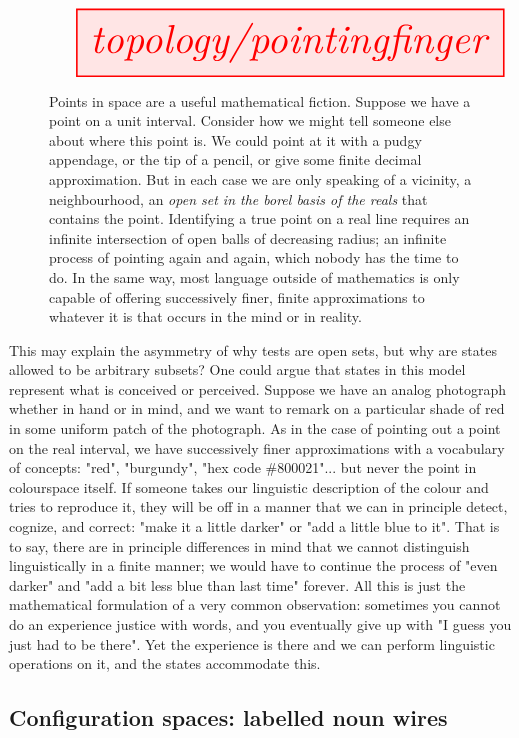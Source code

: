 \begin{figure}[h!]\label{fig:pointing}
\[\resizebox{\textwidth}{!}{\tikzfig{topology/pointingfinger}}\]
\caption{Points in space are a useful mathematical fiction. Suppose we have a point on a unit interval. Consider how we might tell someone else about where this point is. We could point at it with a pudgy appendage, or the tip of a pencil, or give some finite decimal approximation. But in each case we are only speaking of a vicinity, a neighbourhood, an \emph{open set in the borel basis of the reals} that contains the point. Identifying a true point on a real line requires an infinite intersection of open balls of decreasing radius; an infinite process of pointing again and again, which nobody has the time to do. In the same way, most language outside of mathematics is only capable of offering successively finer, finite approximations to whatever it is that occurs in the mind or in reality.}
\end{figure}

This may explain the asymmetry of why tests are open sets, but why are states allowed to be arbitrary subsets? One could argue that states in this model represent what is conceived or perceived. Suppose we have an analog photograph whether in hand or in mind, and we want to remark on a particular shade of red in some uniform patch of the photograph. As in the case of pointing out a point on the real interval, we have successively finer approximations with a vocabulary of concepts: "red", "burgundy", "hex code \#800021"... but never the point in colourspace itself. If someone takes our linguistic description of the colour and tries to reproduce it, they will be off in a manner that we can in principle detect, cognize, and correct: "make it a little darker" or "add a little blue to it". That is to say, there are in principle differences in mind that we cannot distinguish linguistically in a finite manner; we would have to continue the process of "even darker" and "add a bit less blue than last time" forever. All this is just the mathematical formulation of a very common observation: sometimes you cannot do an experience justice with words, and you eventually give up with "I guess you just had to be there". Yet the experience is there and we can perform linguistic operations on it, and the states accommodate this.

\subsection{Configuration spaces: labelled noun wires}

